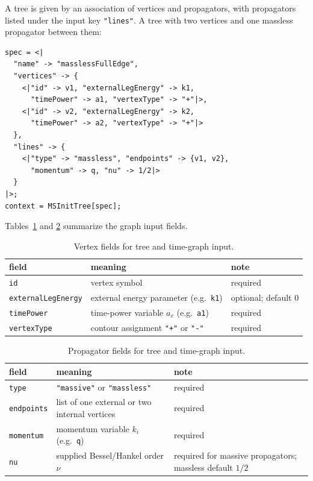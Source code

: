 \documentclass[11pt,a4paper]{article}
\numberwithin{table}{section}
\begin{document}
A tree is given by an association of vertices and propagators, with propagators listed under
the input key \texttt{"lines"}. A tree with two vertices and one massless propagator between them:
\begin{verbatim}
spec = <|
  "name" -> "masslessFullEdge",
  "vertices" -> {
    <|"id" -> v1, "externalLegEnergy" -> k1,
      "timePower" -> a1, "vertexType" -> "+"|>,
    <|"id" -> v2, "externalLegEnergy" -> k2,
      "timePower" -> a2, "vertexType" -> "+"|>
  },
  "lines" -> {
    <|"type" -> "massless", "endpoints" -> {v1, v2},
      "momentum" -> q, "nu" -> 1/2|>
  }
|>;
context = MSInitTree[spec];
\end{verbatim}
Tables~\ref{tab:vertex-fields} and \ref{tab:propagator-fields} summarize the graph input fields.
\begin{table}[htbp]
\centering
\begin{tabular}{@{}lp{5.5cm}p{3.8cm}@{}}
\toprule
field & meaning & note\\
\midrule
\texttt{id} & vertex symbol & required\\
\texttt{externalLegEnergy} & external energy parameter (e.g.\ \texttt{k1}) & optional; default $0$\\
\texttt{timePower} & time-power variable $a_v$ (e.g.\ \texttt{a1}) & required\\
\texttt{vertexType} & contour assignment \texttt{"+"} or \texttt{"-"} & required\\
\bottomrule
\end{tabular}
\caption{Vertex fields for tree and time-graph input.}
\label{tab:vertex-fields}
\end{table}
\FloatBarrier
\begin{table}[htbp]
\centering
\begin{tabular}{@{}p{4.4cm}p{5.3cm}p{3.8cm}@{}}
\toprule
field & meaning & note\\
\midrule
\texttt{type} & \texttt{"massive"} or \texttt{"massless"} & required\\
\texttt{endpoints} & list of one external or two internal vertices & required\\
\texttt{momentum} & momentum variable $k_i$ (e.g.\ \texttt{q}) & required\\
\texttt{nu} & supplied Bessel/Hankel order $\nu$ & required for massive propagators; massless default $1/2$\\
\bottomrule
\end{tabular}
\caption{Propagator fields for tree and time-graph input.}
\label{tab:propagator-fields}
\end{table}
\end{document}

